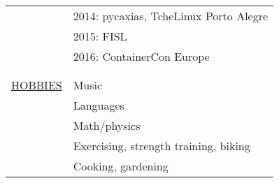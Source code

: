 \begin{center}
\begin{tabular}{rl}
    & 2014: pycaxias, TcheLinux Porto Alegre \\
    & 2015: FISL \\
    & 2016: ContainerCon Europe
    \\\\ \hline \\
    \hyperref[sec:etc]{\uppercase{Hobbies}}
    & Music \\
    & Languages \\
    & Math/physics \\
    & Exercising, strength training, biking \\
    & Cooking, gardening
\end{tabular}

\end{center}
